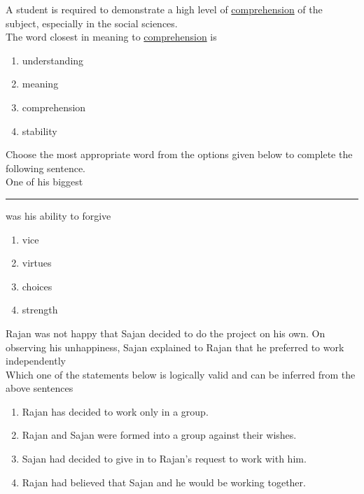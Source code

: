 \iffalse
	\title{2014-MA-1-13}
	\author{EE24Btech11006 - Arnav Mahishi}
	\section{ma}
	\chapter{2014}
\fi
\item{
A student is required to demonstrate a high level of \underline{comprehension} of the subject, especially in the social sciences.\\
The word closest in meaning to \underline{comprehension} is
\begin{multicols}{4}
\begin{enumerate}
\item understanding
\item meaning 
\item comprehension
\item stability
\end{enumerate}
\end{multicols}
}
\item{
Choose the most appropriate word from the options given below to complete the following sentence.\\
One of his biggest \rule{2cm}{0.15mm} was his ability to forgive
\begin{multicols}{4}
\begin{enumerate}
\item vice
\item virtues
\item choices 
\item strength
\end{enumerate}
\end{multicols}}
\item{
Rajan was not happy that Sajan decided to do the project on his own. On observing his unhappiness, Sajan explained to Rajan that he preferred to work independently\\
Which one of the statements below is logically valid and can be inferred from the above sentences
\begin{enumerate}
\item Rajan has decided to work only in a group.
\item Rajan and Sajan were formed into a group against their wishes.
\item Sajan had decided to give in to Rajan's request to work with him.
\item Rajan had believed that Sajan and he would be working together.
\end{enumerate}
}
